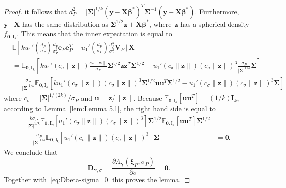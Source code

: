 \documentclass{article}
\numberwithin{equation}{section}
\theoremstyle{plain}
\newcommand{\bbeta}{\bm\beta}
\newcommand{\bxi}{\bm\xi}
\newcommand{\bgamma}{\bm\gamma}
\newcommand{\bSigma}{\mathbf{\Sigma}}
\newcommand{\by}{\mathbf{y}}
\newcommand{\bu}{\mathbf{u}}
\newcommand{\bz}{\mathbf{z}}
\newcommand{\be}{\mathbf{e}}
\newcommand{\bX}{\mathbf{X}}
\newcommand{\bV}{\mathbf{V}}
\newcommand{\bI}{\mathbf{I}}
\newcommand{\bD}{\mathbf{D}}
\newcommand{\E}{\mathbb{E}}
\begin{document}
\begin{proof}
it follows that 
$d^2_P=|\bSigma|^{1/k}(\by-\bX\bbeta^*)^T\bSigma^{-1}(\by-\bX\bbeta^*)$.
Furthermore, $\by\mid\bX$ has the same distribution as $\bSigma^{1/2}\bz+\bX\bbeta^*$,
where~$\bz$ has a spherical density $f_{\mathbf{0},\bI_k}$.
This means that the inner expectation is equal to
\[
\begin{split}
&\E
\left[
ku_1'\left(\frac{d_P}{\sigma_P}\right)
\frac{d_P}{\sigma_P^2}
\be_P\be_P^T
-
u_1'\left(\frac{d_P}{\sigma_P}\right)
\frac{d_P^3}{\sigma_P^2}\bV_P
\,\Bigg|\,
\bX
\right]\\
&=
\E_{\mathbf{0},\bI_k}
\left[
ku_1'\left(c_\sigma\|\bz\|\right)
\frac{c_\sigma\|\bz\|}{\sigma_P}
\bSigma^{1/2}\bz\bz^T\bSigma^{1/2}
-
u_1'\left(c_\sigma\|\bz\|\right)
(c_\sigma\|\bz\|)^3
\frac{\sigma_P}{|\bSigma|^{1/k}}\bSigma
\right]\\
&=
\frac{\sigma_P}{|\bSigma|^{1/k}}
\E_{\mathbf{0},\bI_k}
\left[
ku_1'\left(c_\sigma\|\bz\|\right)
(c_\sigma\|\bz\|)^3
\bSigma^{1/2}
\bu\bu^T
\bSigma^{1/2}
-
u_1'\left(c_\sigma\|\bz\|\right)
(c_\sigma\|\bz\|)^3\bSigma
\right]
\end{split}
\]
where $c_\sigma=|\bSigma|^{1/(2k)}/\sigma_P$ and $\bu=\bz/\|\bz\|$.
Because $\E_{\mathbf{0},\bI_k}\left[\bu\bu^T\right]=(1/k)\bI_k$, according to Lemma~\ref{lem:Lemma 5.1},
the right hand side is equal to
\[
\begin{split}
\frac{k\sigma_P}{|\bSigma|^{1/k}}
\E_{\mathbf{0},\bI_k}
\left[
u_1'\left(c_\sigma\|\bz\|\right)
(c_\sigma\|\bz\|)^3
\right]
\bSigma^{1/2}
\E_{\mathbf{0},\bI_k}
\left[
\bu\bu^T
\right]
\bSigma^{1/2}&\\
-
\frac{\sigma_P}{|\bSigma|^{1/k}}
\E_{\mathbf{0},\bI_k}
\left[
u_1'\left(c_\sigma\|\bz\|\right)
(c_\sigma\|\bz\|)^3
\right]
\bSigma
&=
\mathbf{0}.
\end{split}
\]
We conclude that 
\begin{equation}
\label{eq:Dgamma-sigma=0}
\bD_{\bgamma,\sigma}
=
\frac{\partial\Lambda_{\bgamma}(\bxi_P,\sigma_P)}{\partial\sigma}
=
\textbf{0}.
\end{equation}
Together with~\eqref{eq:Dbeta-sigma=0} this proves the lemma.
\end{proof}
\end{document}

